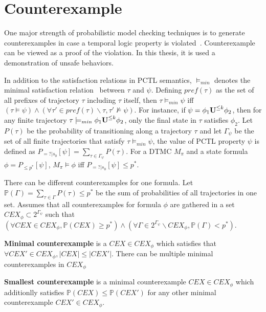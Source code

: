 \section{Counterexample}
One major strength of probabilistic model checking techniques is to generate counterexamples in case a temporal logic property is violated~\cite{4770111}. Counterexample can be viewed as a proof of the violation. In this thesis, it is used a demonstration of unsafe behaviors.

In addition to the satisfaction relations in PCTL semantics, $\models_{min}$ denotes the minimal satisfaction relation~\cite{4770111} between $\tau$ and $\psi$. Defining $pref(\tau)$ as the set of all prefixes of trajectory $\tau$ including $\tau$ itself, then $\tau\models_{min} \psi$ iff $(\tau\models\psi) \wedge (\forall \tau'\in pref(\tau)\backslash\tau, \tau' \nvDash \psi)$. For instance, if $\psi=\phi_1 {\textbf{U}}^{\leq k}\phi_2$, then for any finite trajectory $\tau\models_{min}\phi_1 {\textbf{U}}^{\leq k}\phi_2$, only the final state in $\tau$ satisfies $\phi_2$. Let $P(\tau)$ be the probability of transitioning along a trajectory $\tau$ and let $\Gamma_\psi$ be the set of all finite trajectories that satisfy $\tau\models_{min}\psi$, the value of PCTL property $\psi$ is defined as $P_{=?|s_0}[\psi]=\sum\limits_{\tau\in\Gamma_\psi}P(\tau)$. For a DTMC $M_{\pi}$ and a state formula $\phi= P_{\leq p^*}[\psi]$, $M_{\pi} \models \phi$ iff $P_{=?|s_0}[\psi]\leq p^*$. 

There can be different counterexamples for one formula. Let $\mathbb{P}(\Gamma) = \sum_{\tau\in \Gamma}P(\tau)\leq p^*$ be the sum of probabilities of all trajectories in one set. Assumes that all counterexamples for formula $\phi$ are gathered in a set $CEX_{\phi}\subset 2^{\Gamma_\psi}$ such that $(\forall CEX\in CEX_{\phi},\mathbb{P}(CEX)\geq p^*) \wedge (\forall \Gamma\in 2^{\Gamma_\psi}\backslash CEX_{\phi}, \mathbb{P}(\Gamma)< p^*)$. 

\begin{definition}
\textbf{Minimal counterexample} is a $CEX\in CEX_{\phi}$ which satisfies that $\forall CEX'\in CEX_{\phi}, |CEX|\leq|CEX'|$. There can be multiple minimal counterexamples in $CEX_{\phi}$
\end{definition}

\begin{definition}
\textbf{Smallest counterexample} is a minimal counterexample $CEX\in CEX_{\phi}$ which additionlly satisfies $\mathbb{P}(CEX)\leq \mathbb{P}(CEX')$ for any other minimal counterexample $CEX'\in CEX_{\phi}$.
\end{definition}

